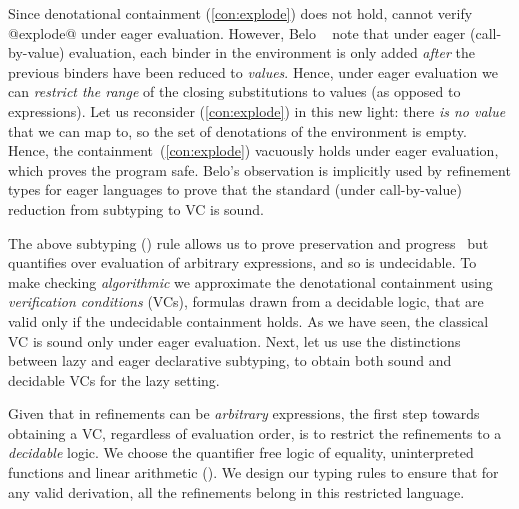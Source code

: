 Since denotational containment (\ref{con:explode}) does not hold,
\hlang cannot verify @explode@ under eager evaluation.
%
However, Belo \etal~\cite{Greenberg11} note that under eager (call-by-value) 
evaluation, each binder in the environment is only added \emph{after} 
the previous binders have been reduced to \emph{values}. 
%
Hence, under eager evaluation we can \emph{restrict the range} of 
the closing substitutions to values (as opposed to expressions).
%
Let us reconsider (\ref{con:explode}) in this new light: 
%
there \emph{is no value} that we can map \ttn to, so the set of
denotations of the environment is empty. Hence, the 
containment~(\ref{con:explode}) vacuously holds under
eager evaluation, which proves the program safe.
%
Belo's observation 
is implicitly used by refinement types for eager languages
to prove that the standard (\ie under call-by-value)
reduction from subtyping to VC is sound.

The above subtyping (\rtdsub) 
rule allows us to prove preservation and progress~\cite{Knowles10} 
but quantifies over evaluation of arbitrary expressions, 
and so is undecidable.
%
To make checking \emph{algorithmic} we approximate the 
denotational containment using \emph{verification conditions} (VCs), 
formulas drawn from a decidable logic, that are valid 
only if the undecidable containment holds.
%
As we have seen, the classical VC is sound only under 
eager evaluation. Next, let us use the distinctions 
between lazy and eager declarative subtyping, 
to obtain both sound and decidable VCs for the lazy setting. 

%
Given that in \hlang refinements can be \emph{arbitrary} expressions,
the first step towards obtaining a VC, regardless of evaluation order,
is to restrict the refinements to a \emph{decidable} logic. 
%
We choose the quantifier free logic of equality, uninterpreted functions 
and linear arithmetic (\logiclang). 
%
We design our typing rules to ensure that for any valid derivation, all
the refinements belong in this restricted language.


